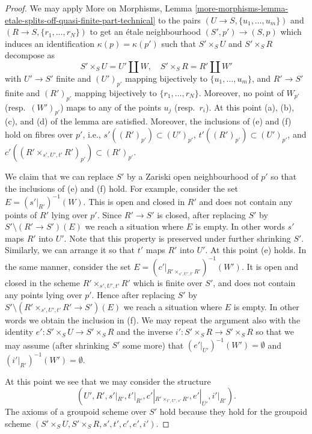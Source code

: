 \documentclass{stacks-project}
\theoremstyle{plain}
\theoremstyle{definition}
\theoremstyle{remark}
\numberwithin{equation}{subsection}
\begin{document}
\begin{proof}
\medskip\noindent
We may apply
More on Morphisms,
Lemma \ref{more-morphisms-lemma-etale-splits-off-quasi-finite-part-technical}
to the pairs
$(U \to S, \{u_1, \ldots, u_m\})$ and
$(R \to S, \{r_1, \ldots, r_N\})$
to get an \'etale neighbourhood $(S', p') \to (S, p)$
which induces an identification $\kappa(p) = \kappa(p')$
such that $S' \times_S U$ and $S' \times_S R$ decompose as
$$
S' \times_S U = U' \amalg W, \quad
S' \times_S R = R' \amalg W'
$$
with $U' \to S'$ finite and $(U')_{p'}$ mapping bijectively to
$\{u_1, \ldots, u_m\}$, and $R' \to S'$ finite and
$(R')_{p'}$ mapping bijectively to $\{r_1, \ldots, r_N\}$.
Moreover, no point of $W_{p'}$ (resp.\ $(W')_{p'}$) maps to
any of the points $u_j$ (resp.\ $r_i$). At this point (a), (b), (c), and (d)
of the lemma are satisfied. Moreover, the inclusions of (e) and (f) hold
on fibres over $p'$, i.e., $s'((R')_{p'}) \subset (U')_{p'}$,
$t'((R')_{p'}) \subset (U')_{p'}$, and
$c'((R' \times_{s', U', t'} R')_{p'}) \subset (R')_{p'}$.

\medskip\noindent
We claim that we can replace $S'$ by a Zariski open neighbourhood
of $p'$ so that the inclusions of (e) and (f) hold.
For example, consider the set $E = (s'|_{R'})^{-1}(W)$.
This is open and closed in $R'$ and does not contain any points
of $R'$ lying over $p'$. Since $R' \to S'$ is closed,
after replacing $S'$ by $S' \setminus (R' \to S')(E)$ we reach a
situation where $E$ is empty. In other words $s'$ maps $R'$ into $U'$.
Note that this property is preserved under further shrinking $S'$.
Similarly, we can arrange it so that $t'$ maps $R'$ into $U'$.
At this point (e) holds. In the same manner, consider the set
$E = (c'|_{R' \times_{s', U', t'} R'})^{-1}(W')$.
It is open and closed in the scheme $R' \times_{s', U', t'} R'$
which is finite over $S'$, and does not contain any points lying
over $p'$. Hence after replacing $S'$ by
$S' \setminus (R' \times_{s', U', t'} R' \to S')(E)$
we reach a situation where $E$ is empty. In other words we obtain
the inclusion in (f). We may repeat the argument also with the identity
$e' : S' \times_S U \to S' \times_S R$ and the inverse
$i' : S' \times_S R \to S' \times_S R$ so that we may assume
(after shrinking $S'$ some more) that $(e'|_{U'})^{-1}(W') = \emptyset$
and $(i'|_{R'})^{-1}(W') = \emptyset$.

\medskip\noindent
At this point we see that we may consider the structure
$$
(U', R', s'|_{R'}, t'|_{R'}, c'|_{R' \times_{t', U', s'} R'},
e'|_{U'}, i'|_{R'}).
$$
The axioms of a groupoid scheme over $S'$ hold
because they hold for the groupoid scheme
$(S' \times_S U, S' \times_S R, s', t', c', e', i')$.
\end{proof}
\end{document}
